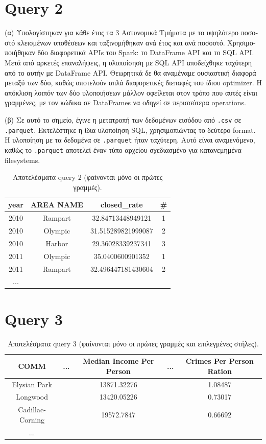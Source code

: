 \documentclass[a4paper,12pt]{article}
\begin{document}
\begin{otherlanguage}{greek}
\section*{Query 2}
	\FloatBarrier
	\par{(α)} Υπολογίστηκαν για κάθε έτος τα 3 Αστυνομικά Τμήματα με το υψηλότερο
	ποσοστό κλεισμένων υποθέσεων και ταξινομήθηκαν ανά έτος και ανά ποσοστό.
	Χρησιμοποιήθηκαν δύο διαφορετικά APIs του Spark: το DataFrame API και το SQL
	API. Μετά από αρκετές επαναλήψεις, η υλοποίσηση με SQL API αποδείχθηκε 
	ταχύτερη από το αυτήν με DataFrame API. Θεωρητικά δε θα αναμέναμε ουσιαστική
	διαφορά μεταξύ των δύο, καθώς αποτελούν απλά διαφορετικές διεπαφές του ίδιου
	optimizer. Η απόκλιση λοιπόν των δύο υλοποιήσεων μάλλον οφείλεται στον τρόπο
	που αυτές είναι γραμμένες, με τον κώδικα σε DataFrames να οδηγεί σε περισσότερα
	operations.
	\par{(β)} Σε αυτό το σημείο, έγινε η μετατροπή των δεδομένων εισόδου από 
	\texttt{.csv} σε \texttt{.parquet}. Εκτελέστηκε η ίδια υλοποίηση SQL,
	χρησιμοπιώντας το δεύτερο format. Η υλοποίηση με τα δεδομένα σε
	\texttt{.parquet} ήταν ταχύτερη. Αυτό είναι αναμενόμενο, καθώς το 
	\texttt{.parquet} αποτελεί έναν τύπο αρχείου σχεδιασμένο για κατανεμημένα
	filesystems.
	\begin{table}[h]
		\centering
		\begin{tabular}{cccc}
			year & AREA NAME & closed\_rate & \# \\
			\hline
			2010 & Rampart & 32.84713448949121 & 1 \\
			2010 & Olympic & 31.515289821999087 & 2 \\
			2010 & Harbor & 29.36028339237341 & 3 \\
			2011 & Olympic & 35.0400600901352 & 1 \\
			2011 & Rampart & 32.496447181430604 & 2 \\
			...
		\end{tabular}
		\caption{Aποτελέσματα query 2 (φαίνονται μόνο οι 
		πρώτες γραμμές).}
	\end{table}
	\FloatBarrier

\section*{Query 3}
	\FloatBarrier
	\lipsum[3] %
	\begin{table}[h]
		\centering
		\begin{tabular}{ccccc}
			COMM & ... & Median Income Per Person & ... & 
			Crimes Per Person Ration \\
			\hline
			Elysian Park & & 13871.32276 & & 1.08487 \\ 
			Longwood & & 13420.05226 & & 0.73017 \\
			Cadillac-Corning & & 19572.7847 & & 0.66692 \\
			...
		\end{tabular}
		\caption{Aποτελέσματα query 3 (φαίνονται μόνο οι 
		πρώτες γραμμές και επιλεγμένες στήλες).}
	\end{table}
	\FloatBarrier


\end{otherlanguage}
\end{document}

